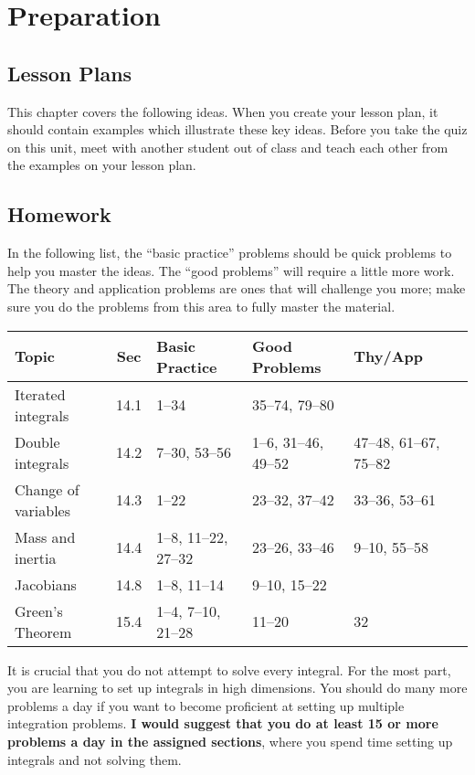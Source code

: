 \section{Preparation}

\subsection{Lesson Plans}

This chapter covers the following ideas. When you create your lesson plan, it should contain examples which illustrate these key ideas. Before you take the quiz on this unit, meet with another student out of class and teach each other from the examples on your lesson plan. 





\subsection{Homework}

In the following list, the ``basic practice'' problems should be quick
problems to help you master the ideas.  The ``good problems'' will
require a little more work.  The theory and application problems are
ones that will challenge you more; make sure you do the problems from
this area to fully master the material.  

\smallskip 
{\noindent
\begin{tabular}{|l|c|l|l|l|l|}\hline
Topic &Sec &Basic Practice &Good Problems &Thy/App \\\hline
Iterated integrals & 14.1 & 1--34 & 35--74, 79--80 & \\\hline
Double integrals & 14.2 & 7--30, 53--56 & 1--6, 31--46, 49--52 & 47--48, 61--67, 75--82\\\hline
Change of variables & 14.3 & 1--22 & 23--32, 37--42 & 33--36, 53--61\\\hline
Mass and inertia & 14.4 & 1--8, 11--22, 27--32 & 23--26, 33--46 & 9--10, 55--58\\\hline
Jacobians & 14.8 & 1--8, 11--14 & 9--10, 15--22 & \\\hline
Green's Theorem & 15.4 & 1--4, 7--10, 21--28 & 11--20 & 32\\\hline
\end{tabular}
} 
\medskip

It is crucial that you do not attempt to solve every integral.  For
the most part, you are learning to set up integrals in high
dimensions. You should do many more problems a day if you want
to become proficient at setting up multiple integration problems.  \textbf{I would suggest
  that you do at least 15 or more problems a day in the assigned
  sections}, where you spend time setting up integrals and not solving
them.


